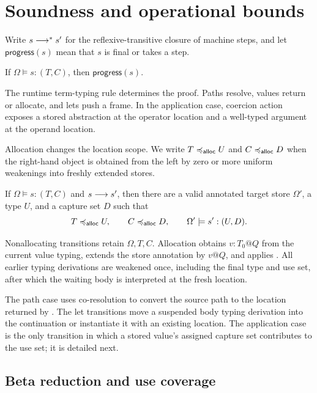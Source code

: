 \documentclass[acmsmall,screen,nonacm]{acmart}
\begin{document}
\section{Soundness and operational bounds}
\label{sec:soundness}

Write \(s\longrightarrow^{*} s'\) for the reflexive-transitive closure of machine steps,
and let \(\mathsf{progress}(s)\) mean that \(s\) is final or takes a step.

\begin{theorem}[Progress]
\label{thm:semantic-progress}
If \(\Omega\models s:(T,C)\), then \(\mathsf{progress}(s)\).
\end{theorem}

The runtime term-typing rule determines the proof. Paths resolve, values
return or allocate, and lets push a frame.  In the application case,
coercion action exposes a stored abstraction at the
operator location and a well-typed argument at the operand location.

Allocation changes the location scope.  We write \(T\mathrel{\preccurlyeq_{\mathsf{alloc}}} U\) and
\(C\mathrel{\preccurlyeq_{\mathsf{alloc}}} D\) when the right-hand object is obtained from the left by zero
or more uniform weakenings into freshly extended stores.

\begin{theorem}
\label{thm:preservation}
If \(\Omega\models s:(T,C)\) and \(s\longrightarrow s'\), then there are a valid
annotated target store \(\Omega'\), a type \(U\), and a capture set \(D\)
such that
\[
 T\mathrel{\preccurlyeq_{\mathsf{alloc}}} U,
 \qquad C\mathrel{\preccurlyeq_{\mathsf{alloc}}} D,
 \qquad \Omega'\models s':(U,D).
\]
\end{theorem}

Nonallocating transitions retain \(\Omega,T,C\). Allocation obtains
\(v:T_0@Q\) from the current value typing, extends the store annotation by
\(v@Q\), and applies . All earlier typing derivations are
weakened once, including the final type and use set, after which the waiting
body is interpreted at the fresh location.

The path case uses co-resolution to convert the source path to the location
returned by . The let transitions move a suspended body
typing derivation into
the continuation or instantiate it with an existing location.  The
application case is the only transition in which a stored value's
assigned capture set contributes to the use set; it is detailed next.

\subsection{Beta reduction and use coverage}
\end{document}
